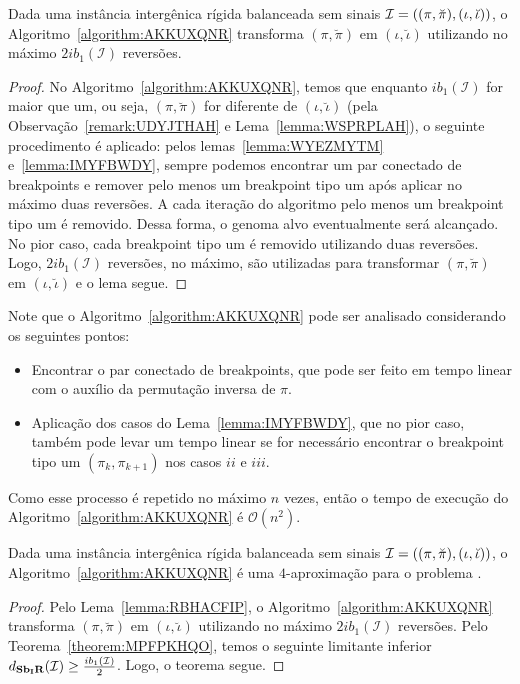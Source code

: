

\begin{lemma}\label{lemma:RBHACFIP}
Dada uma instância intergênica rígida balanceada sem sinais $\mathcal{I}=((\pi,\breve\pi),\break(\iota,\breve\iota))$, o Algoritmo~\ref{algorithm:AKKUXQNR} transforma $(\pi,\breve\pi)$ em $(\iota,\breve\iota)$ utilizando no máximo $2ib_1(\mathcal{I})$ reversões.
\end{lemma}
\begin{proof}
  No Algoritmo~\ref{algorithm:AKKUXQNR}, temos que enquanto $ib_1(\mathcal{I})$ for maior que um, ou seja, $(\pi,\breve\pi)$ for diferente de $(\iota,\breve\iota)$ (pela Observação~\ref{remark:UDYJTHAH} e Lema~\ref{lemma:WSPRPLAH}), o seguinte procedimento é aplicado: pelos lemas~\ref{lemma:WYEZMYTM} e~\ref{lemma:IMYFBWDY}, sempre podemos encontrar um par conectado de breakpoints e remover pelo menos um breakpoint tipo um após aplicar no máximo duas reversões. A cada iteração do algoritmo pelo menos um breakpoint tipo um é removido. Dessa forma, o genoma alvo eventualmente será alcançado. No pior caso, cada breakpoint tipo um é removido utilizando duas reversões. Logo, $2ib_1(\mathcal{I})$ reversões, no máximo, são utilizadas para transformar $(\pi,\breve\pi)$ em $(\iota,\breve\iota)$ e o lema segue.
\end{proof}

Note que o Algoritmo~\ref{algorithm:AKKUXQNR} pode ser analisado considerando os seguintes pontos: 
\begin{itemize}
  \item Encontrar o par conectado de breakpoints, que pode ser feito em tempo linear com o auxílio da permutação inversa de $\pi$.
  \item Aplicação dos casos do Lema~\ref{lemma:IMYFBWDY}, que no pior caso, também pode levar um tempo linear se for necessário encontrar o breakpoint tipo um $(\pi_k,\pi_{k+1})$ nos casos $ii$ e $iii$. 
\end{itemize}
Como esse processo é repetido no máximo $n$ vezes, então o tempo de execução do Algoritmo~\ref{algorithm:AKKUXQNR} é $\mathcal{O}(n^2)$.

\begin{theorem}\label{theorem:BLJAGNDZ}
Dada uma instância intergênica rígida balanceada sem sinais $\mathcal{I}=\break((\pi,\breve\pi),(\iota,\breve\iota))$, o Algoritmo~\ref{algorithm:AKKUXQNR} é uma $4$-aproximação para o problema \SbIR{}.
\end{theorem}
\begin{proof}
Pelo Lema~\ref{lemma:RBHACFIP}, o Algoritmo~\ref{algorithm:AKKUXQNR} transforma $(\pi,\breve\pi)$ em $(\iota,\breve\iota)$ utilizando no máximo $2ib_1(\mathcal{I})$ reversões. Pelo Teorema~\ref{theorem:MPFPKHQO}, temos o seguinte limitante inferior $d_{\textbf{Sb\textsubscript{I}R}}(\mathcal{I}) \ge \frac{ib_1(\mathcal{I})}{2}$. Logo, o teorema segue. 
\end{proof}

